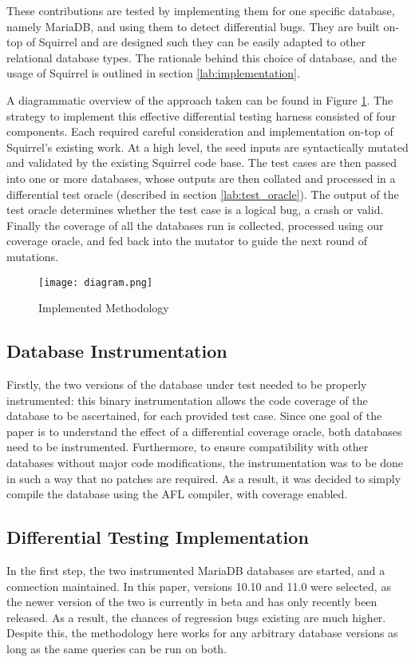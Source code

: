 \documentclass[sigconf]{acmart}
\begin{document}
These contributions are tested by implementing them for one specific database, namely MariaDB, and using them to detect differential bugs. They are built on-top of Squirrel and are designed such they can be easily adapted to other relational database types. The rationale behind this choice of database, and the usage of Squirrel is outlined in section \ref{lab:implementation}.

A diagrammatic overview of the approach taken can be found in Figure \ref{fig:Strategy}. The strategy to implement this effective differential testing harness consisted of four components. Each required careful consideration and implementation on-top of Squirrel's existing work. At a high level, the seed inputs are syntactically mutated and validated by the existing Squirrel code base. The test cases are then passed into one or more databases, whose outputs are then collated and processed in a differential test oracle (described in section \ref{lab:test_oracle}). The output of the test oracle determines whether the test case is a logical bug, a crash or valid. Finally the coverage of all the databases run is collected, processed using our coverage oracle, and fed back into the mutator to guide the next round of mutations.

\begin{figure}
    \centering
    \texttt{[image: diagram.png]}
    \caption{Implemented Methodology}
    \label{fig:Strategy}
\end{figure}

\subsection{Database Instrumentation}
Firstly, the two versions of the database under test needed to be properly instrumented: this binary instrumentation allows the code coverage of the database to be ascertained, for each provided test case. Since one goal of the paper is to understand the effect of a differential coverage oracle, both databases need to be instrumented. Furthermore, to ensure compatibility with other databases without major code modifications, the instrumentation was to be done in such a way that no patches are required. As a result, it was decided to simply compile the database using the AFL compiler, with coverage enabled. 

\subsection{Differential Testing Implementation}
In the first step, the two instrumented MariaDB databases are started, and a connection maintained. In this paper, versions 10.10 and 11.0 were selected, as the newer version of the two is currently in beta and has only recently been released. As a result, the chances of regression bugs existing are much higher. Despite this, the methodology here works for any arbitrary database versions as long as the same queries can be run on both.
\end{document}
